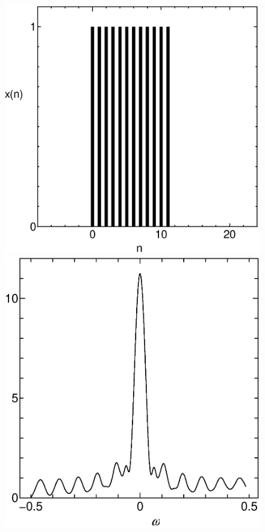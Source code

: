 \begin{figure}[H]
\begin{center}
\begin{minipage}{.38\textwidth}
\begin{center}
\includegraphics[width=.98\textwidth]{fig/zu-7-11-a-1.eps}

\includegraphics[width=.98\textwidth]{fig/zu-7-11-a-2.eps}


\end{center}
\end{minipage}
\end{center}
\end{figure}
